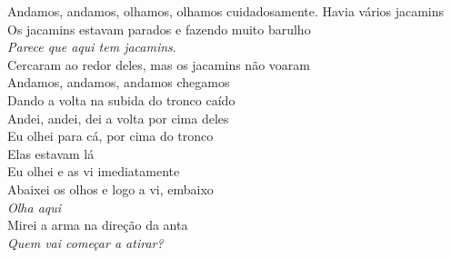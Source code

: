 \bigskip

\begin{linenumbers}\begingroup\raggedright
 
\noindent   Andamos, andamos, olhamos, olhamos cuidadosamente. Havia vários jacamins\\
  Os jacamins estavam parados e fazendo muito barulho\\
  \emph{Parece que aqui tem jacamins}.\\
  Cercaram ao redor deles, mas os jacamins não voaram\\
  Andamos, andamos, andamos chegamos\\
  Dando a volta na subida do tronco caído\\
  Andei, andei, dei a volta por cima deles\\
  Eu olhei para cá, por cima do tronco\\
  Elas estavam lá\\
  Eu olhei e as vi imediatamente\\
  Abaixei os olhos e logo a vi, embaixo\\
  \emph{Olha aqui}\\
  Mirei a arma na direção da anta\\
  \emph{Quem vai começar a atirar?}\\

\end{linenumbers}
